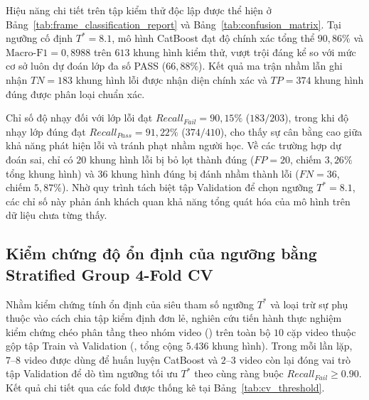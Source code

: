 \documentclass[10pt,conference,a4paper]{IEEEtran}
\begin{document}
Hiệu năng chi tiết trên tập kiểm thử độc lập được thể hiện ở Bảng~\ref{tab:frame_classification_report} và Bảng~\ref{tab:confusion_matrix}. Tại ngưỡng cố định $T^* = 8.1$, mô hình CatBoost đạt độ chính xác tổng thể $90{,}86\%$ và $\text{Macro-F1} = 0{,}8988$ trên $613$ khung hình kiểm thử, vượt trội đáng kể so với mức cơ sở luôn dự đoán lớp đa số PASS ($66{,}88\%$). Kết quả ma trận nhầm lẫn ghi nhận $TN = 183$ khung hình lỗi được nhận diện chính xác và $TP = 374$ khung hình đúng được phân loại chuẩn xác.

Chỉ số độ nhạy đối với lớp lỗi đạt $Recall_{Fail} = 90{,}15\%$ ($183/203$), trong khi độ nhạy lớp đúng đạt $Recall_{Pass}=91{,}22\%$ ($374/410$), cho thấy sự cân bằng cao giữa khả năng phát hiện lỗi và tránh phạt nhầm người học. Về các trường hợp dự đoán sai, chỉ có $20$ khung hình lỗi bị bỏ lọt thành đúng ($FP = 20$, chiếm $3{,}26\%$ tổng khung hình) và $36$ khung hình đúng bị đánh nhầm thành lỗi ($FN = 36$, chiếm $5{,}87\%$). Nhờ quy trình tách biệt tập Validation để chọn ngưỡng $T^* = 8.1$, các chỉ số này phản ánh khách quan khả năng tổng quát hóa của mô hình trên dữ liệu chưa từng thấy.

\subsection{Kiểm chứng độ ổn định của ngưỡng bằng Stratified Group 4-Fold CV}

Nhằm kiểm chứng tính ổn định của siêu tham số ngưỡng $T^*$ và loại trừ sự phụ thuộc vào cách chia tập kiểm định đơn lẻ, nghiên cứu tiến hành thực nghiệm kiểm chứng chéo phân tầng theo nhóm video () trên toàn bộ $10$ cặp video thuộc gộp tập Train và Validation (\text{[1, 2, 3, 4, 7, 8, 10, 11, 12, 15]}, tổng cộng $5.436$ khung hình). Trong mỗi lần lặp, $7\text{--}8$ video được dùng để huấn luyện CatBoost và $2\text{--}3$ video còn lại đóng vai trò tập Validation để dò tìm ngưỡng tối ưu $T^*$ theo cùng ràng buộc $Recall_{Fail} \ge 0.90$. Kết quả chi tiết qua các fold được thống kê tại Bảng~\ref{tab:cv_threshold}.
\end{document}
